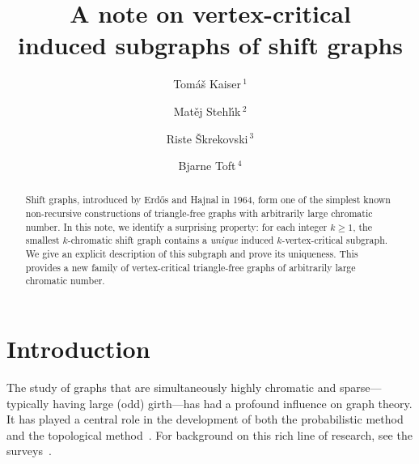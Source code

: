 \documentclass{article}
\begin{document}
{}
\title{\textbf{A note on vertex-critical\\induced subgraphs of shift graphs}}\author{Tom\'{a}\v{s} Kaiser$^{\:1}$
  \and Mat\v{e}j Stehl\'{\i}k$^{\:2}$
  \and Riste \v{S}krekovski$^{\:3}$
  \and Bjarne Toft$^{\:4}$}

\date{}

\maketitle

\begin{abstract}
  Shift graphs, introduced by Erd\H{o}s and Hajnal in 1964, form one of the simplest known non-recursive constructions of triangle-free graphs with arbitrarily large chromatic number. In this note, we identify a surprising property: for each integer $k \geq 1$, the smallest $k$-chromatic shift graph contains a \emph{unique} induced $k$-vertex-critical subgraph. We give an explicit description of this subgraph and prove its uniqueness. This provides a new family of vertex-critical triangle-free graphs of arbitrarily large chromatic number.
\end{abstract}
%
%
%
%

\section{Introduction}

The study of graphs that are simultaneously highly chromatic and sparse---typically having large (odd) girth---has had a profound influence on graph theory. It has played a central role in the development of both the probabilistic method~\cite{Erd59} and the topological method~\cite{Lov78}. For background on this rich line of research, see the surveys~\cite{JT95,Nes13,SS20,SST24,Tof95}.
\end{document}
